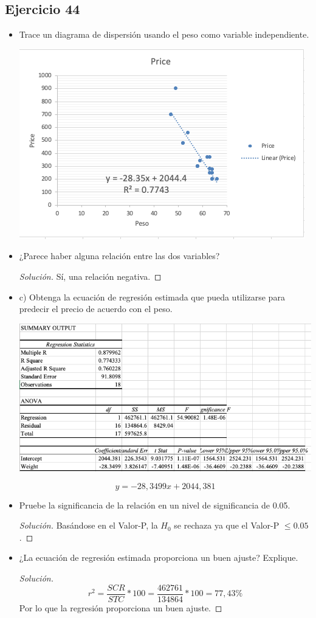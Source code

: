 \documentclass[a4paper,12pt]{article}
\newenvironment{solution}
  {\renewcommand\qedsymbol{$\blacksquare$}\begin{proof}[Solución]}
  {\end{proof}}
\begin{document}
\subsection{Ejercicio 44}
\begin{itemize}
    \item  Trace un diagrama de dispersión usando el peso como variable independiente.
    \begin{center}
        \includegraphics[scale=0.5]{Imagenes/44-1.png}
    \end{center}
    \item ¿Parece haber alguna relación entre las dos variables?
    \begin{solution}
    Sí, una relación negativa.
    \end{solution}
    \item c) Obtenga la ecuación de regresión estimada que pueda utilizarse para predecir el precio de acuerdo con el peso.
    \begin{center}
         \includegraphics[scale=0.5]{Imagenes/44-3.png}
    \end{center}
    $$y=-28,3499x+2044,381$$
    \item Pruebe la significancia de la relación en un nivel de significancia de 0.05.
    \begin{solution}
    Basándose en el Valor-P, la $H_0$ se rechaza ya que el Valor-P $\leq 0.05$. 
    \end{solution}

    \item  ¿La ecuación de regresión estimada proporciona un buen ajuste? Explique.
    \begin{solution}
    $$r^2= \frac{SCR}{STC}*100= \frac{462761}{134864}*100=77,43\% $$
    Por lo que la regresión proporciona un buen ajuste.
    \end{solution}
\end{itemize}
\end{document}
